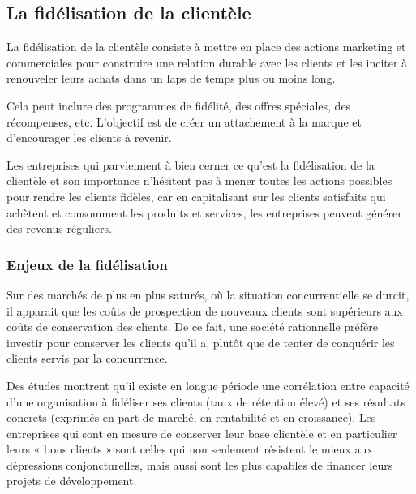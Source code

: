         \subsection[La fidélisation de la clientèle]{La fidélisation de la clientèle}
            La fidélisation de la clientèle consiste à mettre
            en place des actions marketing et commerciales
            pour construire une relation durable avec les
            clients et les inciter à renouveler leurs achats
            dans un laps de temps plus ou moins long. \cite*{Maud2022}
            \par
            Cela peut inclure des programmes de fidélité, des offres
            spéciales, des récompenses, etc.
            L’objectif est de créer un attachement à la marque et
            d’encourager les clients à revenir.
            \par
            Les entreprises qui parviennent à bien cerner ce qu’est
            la fidélisation de la clientèle et son importance n’hésitent
            pas à mener toutes les actions possibles pour rendre les clients
            fidèles, car en capitalisant sur les clients satisfaits
            qui achètent et consomment les produits et services, les entreprises
            peuvent générer des revenus réguliers. \cite*{Maud2022}
            \subsubsection[Enjeux de la fidélisation]{Enjeux de la fidélisation}
            Sur des marchés de plus en plus saturés,
            où la situation concurrentielle se durcit, il apparait que les coûts de prospection
            de nouveaux clients sont supérieurs aux coûts de conservation des clients. \cite*{Reichheld2001loyalty}
            De ce fait, une société rationnelle préfère investir pour conserver
            les clients qu’il a, plutôt que de tenter de conquérir les clients servis par
            la concurrence.
            \par
            Des études montrent qu’il existe en longue période une corrélation entre capacité
            d’une organisation à fidéliser ses clients (taux de rétention élevé) et ses
            résultats concrets (exprimés en part de marché, en rentabilité et en croissance). \cite*{Reichheld2001loyalty}
            Les entreprises qui sont en
            mesure de conserver leur base clientèle et en particulier leurs « bons clients »
            sont celles qui non seulement résistent le mieux aux dépressions conjoncturelles,
            mais aussi sont les plus capables de financer leurs projets de développement.
